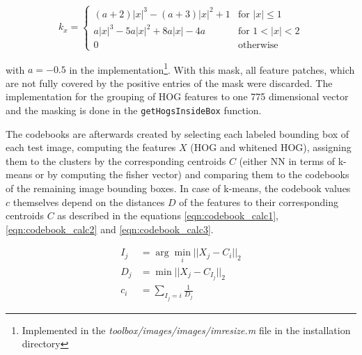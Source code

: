 \begin{equation}
k_x = \begin{cases}
(a+2)|x|^3-(a+3)|x|^2+1 & \text{for } |x| \leq 1 \\
a|x|^3-5a|x|^2+8a|x|-4a & \text{for } 1 < |x| < 2 \\
0                       & \text{otherwise}
\end{cases}
\label{eqn:bicubic_kernel}
\end{equation}

with $a=-0.5$ in the \MATLAB implementation\footnote{Implemented in the \textit{toolbox/images/images/imresize.m} file in the \MATLAB installation directory}. With this mask, all feature patches, which are not fully covered by the positive entries of the mask were discarded. The implementation for the grouping of \ac{HOG} features to one 775 dimensional vector and the masking is done in the \verb|getHogsInsideBox| function.
\bigskip

The codebooks are afterwards created by selecting each labeled bounding box of each test image, computing the features $X$ (\ac{HOG} and whitened \ac{HOG}), assigning them to the clusters by the corresponding centroids $C$ (either \ac{NN} in terms of k-means or by computing the fisher vector) and comparing them to the codebooks of the remaining image bounding boxes. In case of k-means, the codebook values $c$ themselves depend on the distances $D$ of the features to their corresponding centroids $C$ as described in the equations \ref{eqn:codebook_calc1}, \ref{eqn:codebook_calc2} and \ref{eqn:codebook_calc3}.

%	

\begin{align}
	I_j &= \arg \min_i ||X_j - C_i||_2
	    \label{eqn:codebook_calc1} \\
	D_j &= \min ||X_j - C_{I_j}||_2
	    \label{eqn:codebook_calc2} \\
	c_i &= \sum_{I_j = i} \frac{1}{D_j}
	\label{eqn:codebook_calc3}
\end{align}

